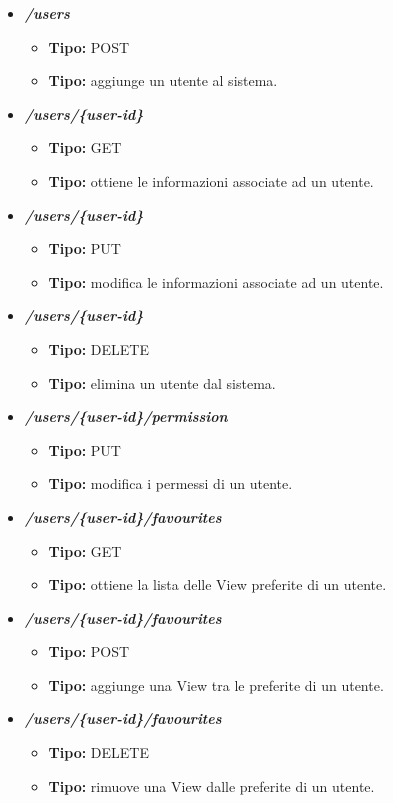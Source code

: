 \begin{itemize}

  \item \textit{\textbf{/users}}
  \begin{itemize}
    \item \textbf{Tipo:} POST
    \item \textbf{Tipo:} aggiunge un utente al sistema.
  \end{itemize}
  \item \textit{\textbf{/users/\{user-id\}}}
  \begin{itemize}
    \item \textbf{Tipo:} GET
    \item \textbf{Tipo:} ottiene le informazioni associate ad un utente.
  \end{itemize}
  \item \textit{\textbf{/users/\{user-id\}}}
  \begin{itemize}
    \item \textbf{Tipo:} PUT
    \item \textbf{Tipo:} modifica le informazioni associate ad un utente.
  \end{itemize}
  \item \textit{\textbf{/users/\{user-id\}}}
  \begin{itemize}
    \item \textbf{Tipo:} DELETE
    \item \textbf{Tipo:} elimina un utente dal sistema.
  \end{itemize}
  \item \textit{\textbf{/users/\{user-id\}/permission}}
  \begin{itemize}
    \item \textbf{Tipo:} PUT
    \item \textbf{Tipo:} modifica i permessi di un utente.
  \end{itemize}
  \item \textit{\textbf{/users/\{user-id\}/favourites}}
  \begin{itemize}
    \item \textbf{Tipo:} GET
    \item \textbf{Tipo:} ottiene la lista delle View preferite di un utente.
  \end{itemize}
  \item \textit{\textbf{/users/\{user-id\}/favourites}}
  \begin{itemize}
    \item \textbf{Tipo:} POST
    \item \textbf{Tipo:} aggiunge una View tra le preferite di un utente.
  \end{itemize}
  \item \textit{\textbf{/users/\{user-id\}/favourites}}
  \begin{itemize}
    \item \textbf{Tipo:} DELETE
    \item \textbf{Tipo:} rimuove una View dalle preferite di un utente.
  \end{itemize}


\end{itemize}
